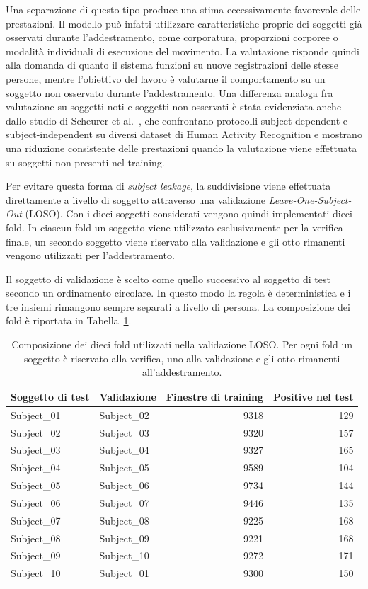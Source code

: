 Una separazione di questo tipo produce una stima eccessivamente favorevole delle prestazioni. Il modello può infatti utilizzare caratteristiche proprie dei soggetti già osservati durante l'addestramento, come corporatura, proporzioni corporee o modalità individuali di esecuzione del movimento. La valutazione risponde quindi alla domanda di quanto il sistema funzioni su nuove registrazioni delle stesse persone, mentre l'obiettivo del lavoro è valutarne il comportamento su un soggetto non osservato durante l'addestramento. Una differenza analoga fra valutazione su soggetti noti e soggetti non osservati è stata evidenziata anche dallo studio di Scheurer et al.~\cite{scheurer}, che confrontano protocolli subject-dependent e subject-independent su diversi dataset di Human Activity Recognition e mostrano una riduzione consistente delle prestazioni quando la valutazione viene effettuata su soggetti non presenti nel training.

Per evitare questa forma di \emph{subject leakage}, la suddivisione viene effettuata direttamente a livello di soggetto attraverso una validazione \emph{Leave-One-Subject-Out} (LOSO). Con i dieci soggetti considerati vengono quindi implementati dieci fold. In ciascun fold un soggetto viene utilizzato esclusivamente per la verifica finale, un secondo soggetto viene riservato alla validazione e gli otto rimanenti vengono utilizzati per l'addestramento.

Il soggetto di validazione è scelto come quello successivo al soggetto di test secondo un ordinamento circolare. In questo modo la regola è deterministica e i tre insiemi rimangono sempre separati a livello di persona. La composizione dei fold è riportata in Tabella~\ref{tab:fold}.

\begin{table}[ht]
\centering
\caption{Composizione dei dieci fold utilizzati nella validazione LOSO. Per
ogni fold un soggetto è riservato alla verifica, uno alla validazione e gli
otto rimanenti all'addestramento.}
\label{tab:fold}
\begin{tabular}{llrr}
\toprule
\textbf{Soggetto di test} &
\textbf{Validazione} &
\textbf{Finestre di training} &
\textbf{Positive nel test} \\
\midrule
Subject\_01 & Subject\_02 & 9318 & 129 \\
Subject\_02 & Subject\_03 & 9320 & 157 \\
Subject\_03 & Subject\_04 & 9327 & 165 \\
Subject\_04 & Subject\_05 & 9589 & 104 \\
Subject\_05 & Subject\_06 & 9734 & 144 \\
Subject\_06 & Subject\_07 & 9446 & 135 \\
Subject\_07 & Subject\_08 & 9225 & 168 \\
Subject\_08 & Subject\_09 & 9221 & 168 \\
Subject\_09 & Subject\_10 & 9272 & 171 \\
Subject\_10 & Subject\_01 & 9300 & 150 \\
\bottomrule
\end{tabular}
\end{table}

